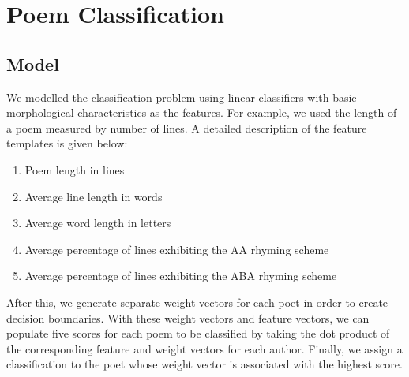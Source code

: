\documentclass[journal]{IEEEtran}
\begin{document}
\section{Poem Classification}
\subsection{Model}
We modelled the classification problem using linear classifiers with basic morphological characteristics as the features. For example, we used the length of a poem measured by number of lines. A detailed description of the feature templates is given below:
\begin{enumerate}
    \item Poem length in lines
    \item Average line length in words
    \item Average word length in letters
    \item Average percentage of lines exhibiting the AA rhyming scheme
    \item Average percentage of lines exhibiting the ABA rhyming scheme
\end{enumerate}

After this, we generate separate weight vectors for each poet in order to create decision boundaries. With these weight vectors and feature vectors, we can populate five scores for each poem to be classified by taking the dot product of the corresponding feature and weight vectors for each author. Finally, we assign a classification to the poet whose weight vector is associated with the highest score.
\end{document}
